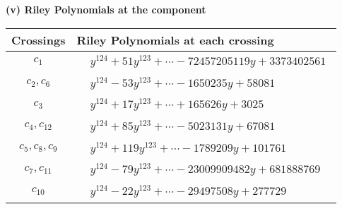 \documentclass[1p]{elsarticle_modified}
\theoremstyle{definition}
\begin{document}
\newpage\renewcommand{\arraystretch}{1}
\flushleft \textbf{(v) Riley Polynomials at the component}\newline \\
\begin{tabular}{m{50pt}|m{274pt}}
Crossings & \hspace{64pt}Riley Polynomials at each crossing \\
\hline $$\begin{aligned}c_{1}\end{aligned}$$&$\begin{aligned}
&y^{124}+51 y^{123}+\cdots-72457205119 y+3373402561
\end{aligned}$\\
\hline $$\begin{aligned}c_{2},c_{6}\end{aligned}$$&$\begin{aligned}
&y^{124}-53 y^{123}+\cdots-1650235 y+58081
\end{aligned}$\\
\hline $$\begin{aligned}c_{3}\end{aligned}$$&$\begin{aligned}
&y^{124}+17 y^{123}+\cdots+165626 y+3025
\end{aligned}$\\
\hline $$\begin{aligned}c_{4},c_{12}\end{aligned}$$&$\begin{aligned}
&y^{124}+85 y^{123}+\cdots-5023131 y+67081
\end{aligned}$\\
\hline $$\begin{aligned}c_{5},c_{8},c_{9}\end{aligned}$$&$\begin{aligned}
&y^{124}+119 y^{123}+\cdots-1789209 y+101761
\end{aligned}$\\
\hline $$\begin{aligned}c_{7},c_{11}\end{aligned}$$&$\begin{aligned}
&y^{124}-79 y^{123}+\cdots-23009909482 y+681888769
\end{aligned}$\\
\hline $$\begin{aligned}c_{10}\end{aligned}$$&$\begin{aligned}
&y^{124}-22 y^{123}+\cdots-29497508 y+277729
\end{aligned}$\\
\hline
\end{tabular}\\~\\
\end{document}
